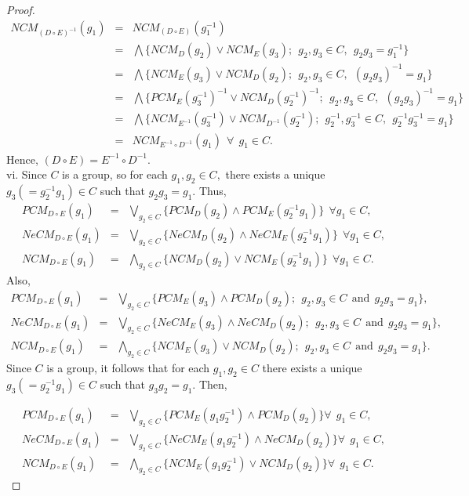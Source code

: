 \documentclass[12pt,letterpaper]{amsart}
\newcommand{\dis}{\displaystyle}
\theoremstyle{plain}
\theoremstyle{definition}
\numberwithin{equation}{section}
\begin{document}
\begin{proof}
\begin{eqnarray*}
NCM_{ (D \circ E)^{-1}}(g_1) & = & NCM_{ (D \circ E)}(g^{-1}_1)\\
& = & \bigwedge \lbrace  NCM_{D}(g_2) \vee NCM_{E}(g_3);~~ g_2, g_3 \in C,~~ g_2g_3 = g_1^{-1} \rbrace \\
& = & \bigwedge \lbrace  NCM_{E}(g_3) \vee NCM_{D}(g_2);~~ g_2, g_3 \in C,~~ (g_2g_3)^{-1} = g_1 \rbrace\\
& = & \bigwedge \lbrace  PCM_{E}(g^{-1}_3)^{-1} \vee NCM_{D}(g^{-1}_2)^{-1};~~ g_2, g_3 \in C,~~ (g_2g_3)^{-1} = g_1 \rbrace\\
& = & \bigwedge \lbrace  NCM_{E^{-1}}(g^{-1}_3) \vee NCM_{D^{-1}}(g^{-1}_2);~~ g^{-1}_2, g^{-1}_3 \in C,~~ g^{-1}_2g^{-1}_3 = g_1 \rbrace\\
& = & NCM_{E^{-1} \circ D^{-1}}(g_1)~~ \forall~~ g_1 \in C.
\end{eqnarray*}
Hence, $(D \circ E) = E^{-1} \circ D^{-1}.$\\

vi. Since $C$ is a group, so for each $g_1, g_2 \in C,$ there exists a unique $g_3 (= g^{-1}_2 g_1) \in C$ such that $g_2 g_3 = g_1.$ Thus, 
\begin{eqnarray*}
PCM_{D \circ E}(g_1) & = & \dis \bigvee_{g_2 \in C} \lbrace  PCM_{D}(g_2) \wedge PCM_{E}(g^{-1}_2 g_1) \rbrace~~ \forall g_1 \in C, \\
NeCM_{D \circ E}(g_1) & = & \dis \bigvee_{g_2 \in C} \lbrace  NeCM_{D}(g_2) \wedge NeCM_{E}(g^{-1}_2 g_1) \rbrace~~ \forall g_1 \in C, \\ 
NCM_{D \circ E}(g_1) & = & \dis \bigwedge_{g_2 \in C} \lbrace  NCM_{D}(g_2) \vee NCM_{E}(g^{-1}_2 g_1) \rbrace~~ \forall g_1 \in C.
\end{eqnarray*}
Also,
\begin{eqnarray*}
PCM_{D \circ E}(g_1) & = & \dis \bigvee_{g_2 \in C} \lbrace  PCM_{E}(g_3) \wedge PCM_{D}(g_2);~~ g_2, g_3 \in C ~~\text{and}~~ g_2 g_3 = g_1 \rbrace, \\
NeCM_{D \circ E}(g_1) & = & \dis \bigvee_{g_2 \in C} \lbrace  NeCM_{E}(g_3) \wedge NeCM_{D}(g_2);~~ g_2, g_3 \in C ~~\text{and}~~ g_2 g_3 = g_1 \rbrace, \\ 
NCM_{D \circ E}(g_1) & = & \dis \bigwedge_{g_2 \in C} \lbrace  NCM_{E}(g_3) \vee NCM_{D}(g_2);~~ g_2, g_3 \in C ~~\text{and}~~ g_2 g_3 = g_1 \rbrace.
\end{eqnarray*}
Since $C$ is a group, it follows that for each $g_1, g_2 \in C$ there exists a unique $g_3 (= g^{-1}_2 g_1) \in C$ such that $g_3 g_2 = g_1.$ Then, 

\begin{eqnarray*}
PCM_{D \circ E}(g_1) & = & \dis \bigvee_{g_2 \in C} \lbrace  PCM_{E}(g_1g_2^{-1}) \wedge PCM_{D}(g_2) \rbrace \forall~~ g_1 \in C, \\
NeCM_{D \circ E}(g_1) & = & \dis \bigvee_{g_2 \in C} \lbrace  NeCM_{E}(g_1g_2^{-1}) \wedge NeCM_{D}(g_2) \rbrace \forall~~ g_1 \in C,\\ 
NCM_{D \circ E}(g_1) & = & \dis \bigwedge_{g_2 \in C} \lbrace  NCM_{E}(g_1g_2^{-1}) \vee NCM_{D}(g_2) \rbrace \forall~~ g_1 \in C.
\end{eqnarray*}
\end{proof}
\end{document}
